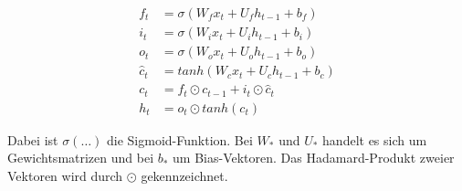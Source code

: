 \begin{equation*}
\begin{align*}
	f_t &= \sigma(W_f x_t + U_f h_{t-1} + b_f) \\
	i_t &= \sigma(W_i x_t + U_i h_{t-1} + b_i) \\
	o_t &= \sigma(W_o x_t + U_o h_{t-1} + b_o) \\
	\hat{c}_t &= tanh(W_c x_t + U_c h_{t-1} + b_c) \\
	c_t &= f_t \odot c_{t-1} + i_t \odot \hat{c}_t \\
	h_t &= o_t \odot tanh(c_t)
\end{align*}
\end{equation*}

Dabei ist $\sigma(\dots)$ die Sigmoid-Funktion. Bei $W_*$ und $U_*$ handelt es sich um Gewichtsmatrizen und bei $b_*$ um Bias-Vektoren. Das Hadamard-Produkt zweier Vektoren wird durch $\odot$ gekennzeichnet.
